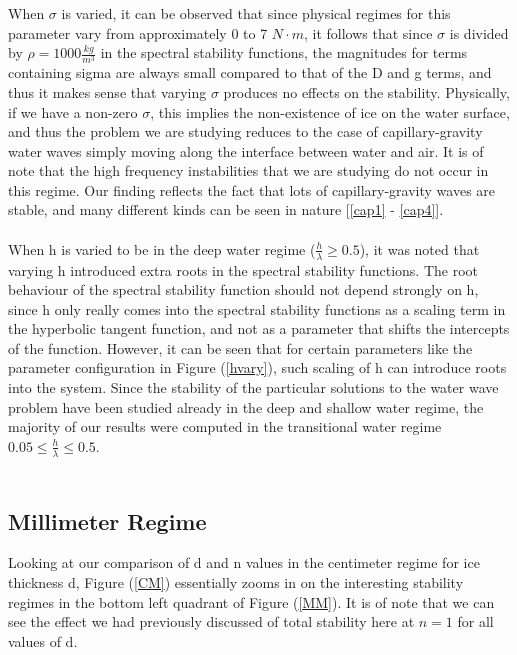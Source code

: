 \documentclass{article}
\begin{document}
When \(\sigma\) is varied, it can be observed that since physical regimes for this parameter vary from approximately 0 to 7 \(N \cdot m\), it follows that since \(\sigma\) is divided by \(\rho = 1000 \frac{kg}{m^3}\) in the spectral stability functions, the magnitudes for terms containing sigma are always small compared to that of the D and g terms, and thus it makes sense that varying \(\sigma\) produces no effects on the stability. Physically, if we have a non-zero \(\sigma\), this implies the non-existence of ice on the water surface, and thus the problem we are studying reduces to the case of capillary-gravity water waves simply moving along the interface between water and air. It is of note that the high frequency instabilities that we are studying do not occur in this regime. Our finding reflects the fact that lots of capillary-gravity waves are stable, and many different kinds can be seen in nature [\ref{cap1} - \ref{cap4}]. 
\\
\\

When h is varied to be in the deep water regime (\(\frac{h}{\lambda} \geq 0.5\)), it was noted that varying h introduced extra roots in the spectral stability functions. The root behaviour of the spectral stability function should not depend strongly on h, since h only really comes into the spectral stability functions as a scaling term in the hyperbolic tangent function, and not as a parameter that shifts the intercepts of the function. However, it can be seen that for certain parameters like the parameter configuration in Figure (\ref{hvary}), such scaling of h can introduce roots into the system. Since the stability of the particular solutions to the water wave problem have been studied already in the deep and shallow water regime, the majority of our results were computed in the transitional water regime \(0.05 \leq \frac{h}{\lambda} \leq 0.5\). 
\\
\\

\subsection{Millimeter Regime}

Looking at our comparison of d and n values in the centimeter regime for ice thickness d, Figure (\ref{CM}) essentially zooms in on the interesting stability regimes in the bottom left quadrant of Figure (\ref{MM}). It is of note that we can see the effect we had previously discussed of total stability here at \(n = 1\) for all values of d. 
\\
\end{document}
